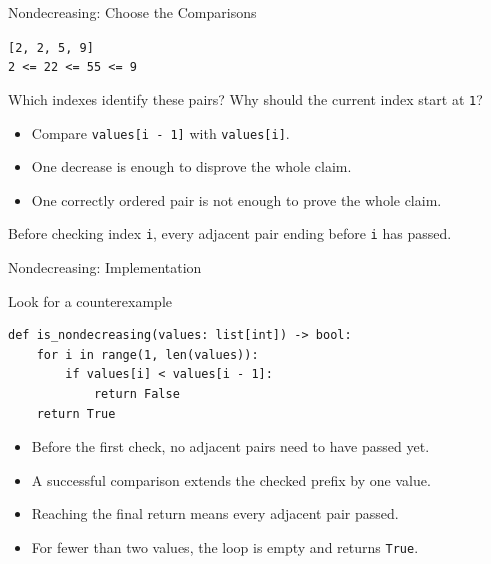 \documentclass[aspectratio=169,10pt]{beamer}
\begin{document}
\begin{frame}{Nondecreasing: Choose the Comparisons}
\small
\begin{center}
\texttt{[2, 2, 5, 9]}\\[8pt]
\texttt{2 <= 2}\qquad\texttt{2 <= 5}\qquad\texttt{5 <= 9}
\end{center}
\begin{activity}
Which indexes identify these pairs? Why should the current index start at \texttt{1}?
\end{activity}
\begin{itemize}
 \item Compare \texttt{values[i - 1]} with \texttt{values[i]}.
 \item One decrease is enough to disprove the whole claim.
 \item One correctly ordered pair is not enough to prove the whole claim.
\end{itemize}
\begin{keyidea}Before checking index \texttt{i}, every adjacent pair ending before \texttt{i} has passed.\end{keyidea}
\end{frame}

\begin{frame}[fragile]{Nondecreasing: Implementation}
\small
\begin{block}{Look for a counterexample}
\footnotesize
\begin{verbatim}
def is_nondecreasing(values: list[int]) -> bool:
    for i in range(1, len(values)):
        if values[i] < values[i - 1]:
            return False
    return True
\end{verbatim}
\end{block}
\begin{itemize}
 \item Before the first check, no adjacent pairs need to have passed yet.
 \item A successful comparison extends the checked prefix by one value.
 \item Reaching the final return means every adjacent pair passed.
 \item For fewer than two values, the loop is empty and returns \texttt{True}.
\end{itemize}
\end{frame}
\end{document}
